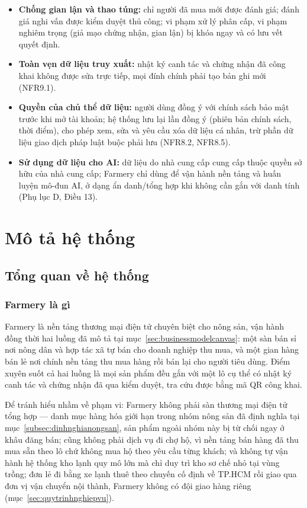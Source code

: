 \begin{itemize}
    \item \textbf{Chống gian lận và thao túng:} chỉ người đã mua mới được đánh giá; đánh giá nghi vấn được kiểm duyệt thủ công; vi phạm xử lý phân cấp, vi phạm nghiêm trọng (giả mạo chứng nhận, gian lận) bị khóa ngay và có lưu vết quyết định.
    \item \textbf{Toàn vẹn dữ liệu truy xuất:} nhật ký canh tác và chứng nhận đã công khai không được sửa trực tiếp, mọi đính chính phải tạo bản ghi mới (NFR9.1).
    \item \textbf{Quyền của chủ thể dữ liệu:} người dùng đồng ý với chính sách bảo mật trước khi mở tài khoản; hệ thống lưu lại lần đồng ý (phiên bản chính sách, thời điểm), cho phép xem, sửa và yêu cầu xóa dữ liệu cá nhân, trừ phần dữ liệu giao dịch pháp luật buộc phải lưu (NFR8.2, NFR8.5).
    \item \textbf{Sử dụng dữ liệu cho AI:} dữ liệu do nhà cung cấp cung cấp thuộc quyền sở hữu của nhà cung cấp; Farmery chỉ dùng để vận hành nền tảng và huấn luyện mô-đun AI, ở dạng ẩn danh/tổng hợp khi không cần gắn với danh tính (Phụ lục D, Điều 13).
\end{itemize}

\section{Mô tả hệ thống}
\label{sec:motahethong}

\subsection{Tổng quan về hệ thống}
\label{sec:luongvanhanh}

\subsubsection*{Farmery là gì}

Farmery là nền tảng thương mại điện tử chuyên biệt cho nông sản, vận hành đồng thời hai luồng đã mô tả tại mục~\ref{sec:businessmodelcanvas}: một sàn bán sỉ nơi nông dân và hợp tác xã tự bán cho doanh nghiệp thu mua, và một gian hàng bán lẻ nơi chính nền tảng thu mua hàng rồi bán lại cho người tiêu dùng. Điểm xuyên suốt cả hai luồng là mọi sản phẩm đều gắn với một lô cụ thể có nhật ký canh tác và chứng nhận đã qua kiểm duyệt, tra cứu được bằng mã QR công khai.

Để tránh hiểu nhầm về phạm vi: Farmery không phải sàn thương mại điện tử tổng hợp --- danh mục hàng hóa giới hạn trong nhóm nông sản đã định nghĩa tại mục~\ref{subsec:dinhnghianongsan}, sản phẩm ngoài nhóm này bị từ chối ngay ở khâu đăng bán; cũng không phải dịch vụ đi chợ hộ, vì nền tảng bán hàng đã thu mua sẵn theo lô chứ không mua hộ theo yêu cầu từng khách; và không tự vận hành hệ thống kho lạnh quy mô lớn mà chỉ duy trì kho sơ chế nhỏ tại vùng trồng; đơn lẻ đi bằng xe lạnh thuê theo chuyến cố định về TP.HCM rồi giao qua đơn vị vận chuyển nội thành, Farmery không có đội giao hàng riêng (mục~\ref{sec:quytrinhnghiepvu}).

